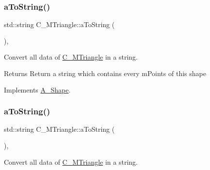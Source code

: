 \mbox{\label{classC__MTriangle_a3a769eb21278ec456292d88385b332a2}} 
\subsubsection{\texorpdfstring{a\+To\+String()}{aToString()}\hspace{0.1cm}{\footnotesize\ttfamily [1/2]}}
{\footnotesize\ttfamily std\+::string C\+\_\+\+M\+Triangle\+::a\+To\+String (\begin{DoxyParamCaption}{ }\end{DoxyParamCaption})\hspace{0.3cm}{\ttfamily [override]}, {\ttfamily [virtual]}}



Convert all data of \hyperlink{classC__MTriangle}{C\+\_\+\+M\+Triangle} in a string. 

\begin{DoxyReturn}{Returns}
Return a string which contains every m\+Points of this shape 
\end{DoxyReturn}


Implements \hyperlink{classA__Shape_ad8804b4e74543db374af6892367b7c2e}{A\+\_\+\+Shape}.

\mbox{\label{classC__MTriangle_a3a769eb21278ec456292d88385b332a2}} 
\subsubsection{\texorpdfstring{a\+To\+String()}{aToString()}\hspace{0.1cm}{\footnotesize\ttfamily [2/2]}}
{\footnotesize\ttfamily std\+::string C\+\_\+\+M\+Triangle\+::a\+To\+String (\begin{DoxyParamCaption}{ }\end{DoxyParamCaption})\hspace{0.3cm}{\ttfamily [override]}, {\ttfamily [virtual]}}



Convert all data of \hyperlink{classC__MTriangle}{C\+\_\+\+M\+Triangle} in a string. 

